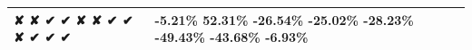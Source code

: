 \begin{tabular}{ll}
\toprule
✘ ✘ ✔ ✔ ✘ ✘ ✔ ✔ ✘ ✔ ✔ ✔ & -5.21\% 52.31\% -26.54\% -25.02\% -28.23\% -49.43\% -43.68\% -6.93\% \\
\midrule
\bottomrule
\end{tabular}
